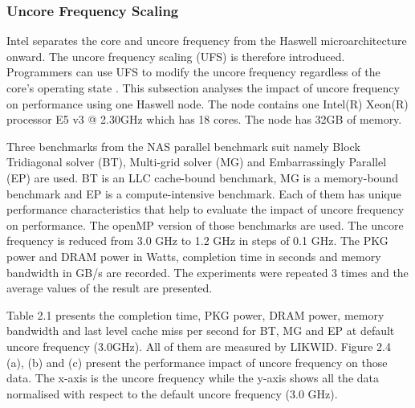 \subsubsection{Uncore Frequency Scaling}
Intel separates the core and uncore frequency from the Haswell microarchitecture onward. The uncore frequency scaling (UFS) is therefore introduced. Programmers can use UFS to modify the uncore frequency regardless of the core's operating state \cite{21}. This subsection analyses the impact of uncore frequency on performance using one Haswell node. The node contains one Intel(R) Xeon(R) processor E5 v3 @ 2.30GHz which has 18 cores. The node has 32GB of memory. 

Three benchmarks from the NAS parallel benchmark \cite{23} suit namely Block Tridiagonal solver (BT), Multi-grid solver (MG) and Embarrassingly Parallel (EP) are used. BT is an LLC cache-bound benchmark, MG is a memory-bound benchmark and EP is a compute-intensive benchmark. Each of them has unique performance characteristics that help to evaluate the impact of uncore frequency on performance. The openMP version of those benchmarks are  used. The uncore frequency is reduced from 3.0 GHz to 1.2 GHz in steps of 0.1 GHz. The PKG power and DRAM power in Watts,  completion time in seconds and memory bandwidth in GB/s are recorded. The experiments were repeated 3 times and the average values of the result  are presented. 

Table 2.1 presents the completion time, PKG power, DRAM power, memory bandwidth and last level cache miss per second for BT, MG and EP at default uncore frequency (3.0GHz). All of them are measured by LIKWID. Figure 2.4 (a), (b) and (c) present the performance impact of uncore frequency on those data. The x-axis is the uncore frequency while the y-axis shows all the data normalised with respect to the default uncore frequency (3.0 GHz). 

